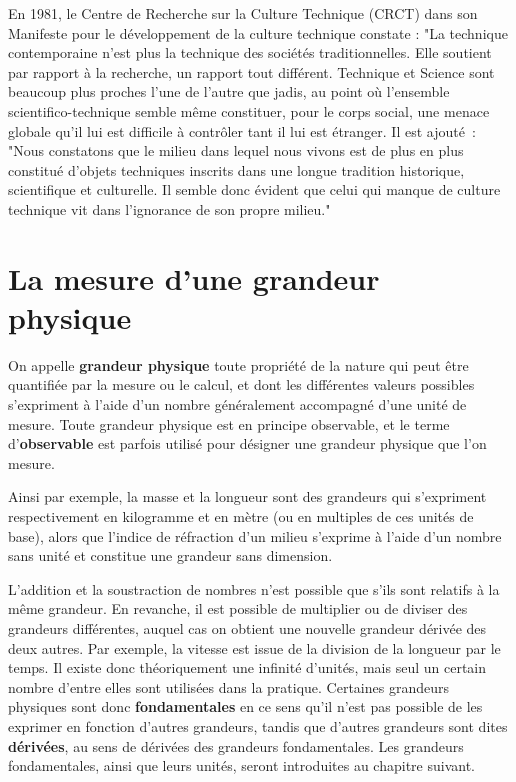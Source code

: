 \documentclass[main.tex]{subfiles}
\begin{document}
En 1981, le Centre de Recherche sur la Culture Technique (CRCT) dans son Manifeste pour le développement de la culture technique constate : "La technique contemporaine n'est plus la technique des sociétés traditionnelles. Elle soutient par rapport à la recherche, un rapport tout différent. Technique et Science sont beaucoup plus proches l'une de l'autre que jadis, au point où l'ensemble scientifico-technique semble même constituer, pour le corps social, une menace globale qu'il lui est difficile à contrôler tant il lui est étranger. Il est ajouté~: "Nous constatons que le milieu dans lequel nous vivons est de plus en plus constitué d'objets techniques inscrits dans une longue tradition historique, scientifique et culturelle.  Il semble donc évident que celui qui manque de culture technique vit dans l'ignorance de son propre milieu."

\rm

\section{La mesure d'une grandeur physique}

On appelle \textbf{grandeur physique} toute propriété de la nature qui peut être quantifiée par la mesure ou le calcul, et dont les différentes valeurs possibles s'expriment à l'aide d'un nombre généralement accompagné d'une unité de mesure. Toute grandeur physique est en principe observable, et le terme d'\textbf{observable} est parfois utilisé pour désigner une grandeur physique que l'on mesure.

Ainsi par exemple, la masse et la longueur sont des grandeurs qui s'expriment respectivement en kilogramme et en mètre (ou en multiples de ces unités de base), alors que l'indice de réfraction d'un milieu s'exprime à l'aide d'un nombre sans unité et constitue une grandeur sans dimension.

L'addition et la soustraction de nombres n'est possible que s'ils sont relatifs à la même grandeur. En revanche, il est possible de multiplier ou de diviser des grandeurs différentes, auquel cas on obtient une nouvelle grandeur dérivée des deux autres. Par exemple, la vitesse est issue de la division de la longueur par le temps. Il existe donc théoriquement une infinité d'unités, mais seul un certain nombre d'entre elles sont utilisées dans la pratique. Certaines grandeurs physiques sont donc \textbf{fondamentales} en ce sens qu'il n'est pas possible de les exprimer en fonction d'autres grandeurs, tandis que d'autres grandeurs sont dites \textbf{dérivées}, au sens de dérivées des grandeurs fondamentales. Les grandeurs fondamentales, ainsi que leurs unités, seront introduites au chapitre suivant.
\end{document}
